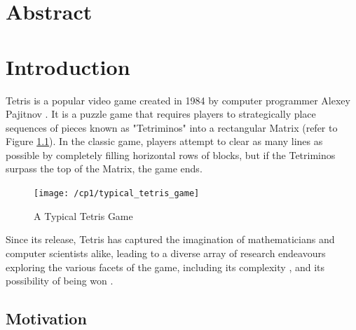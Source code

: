 \documentclass[a4paper, 12pt]{extreport}
\begin{document}
	\chapter*{Abstract}
	
	
	\tableofcontents
	
	\chapter{Introduction}
	
		
		Tetris is a popular video game created in 1984 by computer programmer Alexey Pajitnov  \cite{about-tetris}. It is a puzzle game that requires players to strategically place sequences of pieces known as "Tetriminos" into a rectangular Matrix (refer to Figure \ref{tetrisgame}). In the classic game, players attempt to clear as many lines as possible by completely filling horizontal rows of blocks, but if the Tetriminos surpass the top of the Matrix, the game ends.
		
		\begin{figure}[h]
			\centering
			\texttt{[image: /cp1/typical\_tetris\_game]}
			\caption{A Typical Tetris Game}
			\label{tetrisgame}
		\end{figure}
		
		Since its release, Tetris has captured the imagination of mathematicians and computer scientists alike, leading to a diverse array of research endeavours exploring the various facets of the game, including its complexity \cite{tetris-is-hard-even-to-approx}, and its possibility of being won \cite{can-you-win-at-tetris} \cite{how-to-lose-at-tetris}.
		
		
		
		\section{Motivation}
		
			
\end{document}
